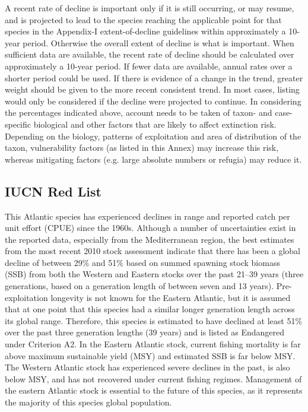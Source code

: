 \documentclass[a4paper,10pt]{article}
\begin{document}
A recent rate of decline is important only if it is still occurring, or may resume, and is projected to lead to the species reaching the applicable point for that species in the Appendix-I extent-of-decline guidelines within approximately a 10-year period. Otherwise the overall extent of decline is what is important. When sufficient data are available, the recent rate of decline should be calculated over approximately a 10-year period. If fewer data are available, annual rates over a shorter period could be used. If there is evidence of a change in the trend, greater weight should be given to the more recent consistent trend. In most cases, listing would only be considered if the decline were projected to continue.
In considering the percentages indicated above, account needs to be taken of taxon- and case-specific biological and other factors that are likely to affect extinction risk. Depending on the biology, patterns of exploitation and area of distribution of the taxon, vulnerability factors (as listed in this Annex) may increase this risk, whereas mitigating factors (e.g. large absolute numbers or refugia) may reduce it. 

\subsection*{IUCN Red List}
This Atlantic species has experienced declines in range and reported catch per unit effort (CPUE) since the 1960s. Although a number of uncertainties exist in the reported data, especially from the Mediterranean region, the best estimates from the most recent 2010 stock assessment indicate that there has been a global decline of between 29\% and 51\% based on summed spawning stock biomass (SSB) from both the Western and Eastern stocks over the past 21–39 years (three generations, based on a generation length of between seven and 13 years). Pre-exploitation longevity is not known for the Eastern Atlantic, but it is assumed that at one point that this species had a similar longer generation length across its global range. Therefore, this species is estimated to have declined at least 51\% over the past three generation lengths (39 years) and is listed as Endangered under Criterion A2. In the Eastern Atlantic stock, current fishing mortality is far above maximum sustainable yield (MSY) and estimated SSB is far 
below MSY. The Western Atlantic stock has experienced severe declines in the past, is also below MSY, and has not recovered under current fishing regimes. Management of the eastern Atlantic stock is essential to the future of this species, as it represents the majority of this species global population. 
\end{document}
